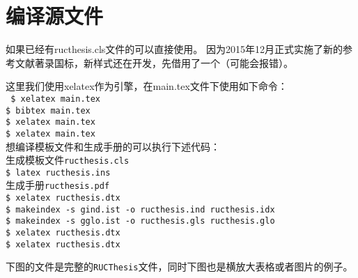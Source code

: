 \section{编译源文件}
如果已经有ructhesis.cls文件的可以直接使用。
因为2015年12月正式实施了新的参考文献著录国标，新样式还在开发，先借用了一个（可能会报错）。 \par
这里我们使用xelatex作为引擎，在main.tex文件下使用如下命令：\\
{\tt
\$ xelatex main.tex\\
\$ bibtex main.tex\\
\$ xelatex main.tex\\
\$ xelatex main.tex\\}
想编译模板文件和生成手册的可以执行下述代码：\\
生成模板文件{\tt ructhesis.cls}\\
{\tt\$ latex ructhesis.ins}\\
生成手册{\tt ructhesis.pdf\\
\$ xelatex ructhesis.dtx\\
\$ makeindex -s gind.ist -o ructhesis.ind ructhesis.idx\\
\$ makeindex -s gglo.ist -o ructhesis.gls ructhesis.glo\\
\$ xelatex ructhesis.dtx\\
\$ xelatex ructhesis.dtx}\par
下图的文件是完整的{\tt RUCThesis}文件，同时下图也是横放大表格或者图片的例子。

